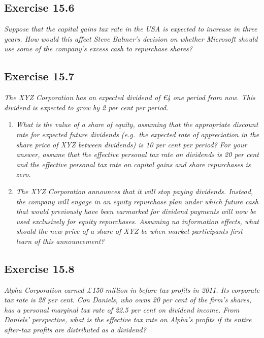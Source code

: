 \documentclass[]{book}
\newcommand{\euro}{€}
\theoremstyle{definition}
\theoremstyle{definition}
\theoremstyle{remark}
\begin{document}
\subsection{Exercise 15.6}\label{exercise-15.6}

\emph{Suppose that the capital gains tax rate in the USA is expected to
increase in three years. How would this affect Steve Balmer's decision
on whether Microsoft should use some of the company's excess cash to
repurchase shares?} \citep[p.518]{book}

\subsection{Exercise 15.7}\label{exercise-15.7}

\emph{The XYZ Corporation has an expected dividend of \euro{}4 one
period from now. This dividend is expected to grow by 2 per cent per
period.} \citep[p.518]{book}

\begin{enumerate}
\def\labelenumi{\alph{enumi}.}
\item
  \emph{What is the value of a share of equity, assuming that the
  appropriate discount rate for expected future dividends (e.g.~the
  expected rate of appreciation in the share price of XYZ between
  dividends) is 10 per cent per period? For your answer, assume that the
  effective personal tax rate on dividends is 20 per cent and the
  effective personal tax rate on capital gains and share repurchases is
  zero.} \citep[p.518]{book}
\item
  \emph{The XYZ Corporation announces that it will stop paying
  dividends. Instead, the company will engage in an equity repurchase
  plan under which future cash that would previously have been earmarked
  for dividend payments will now be used exclusively for equity
  repurchases. Assuming no information effects, what should the new
  price of a share of XYZ be when market participants first learn of
  this announcement?} \citep[p.518]{book}
\end{enumerate}

\subsection{Exercise 15.8}\label{exercise-15.8}

\emph{Alpha Corporation earned £150 million in before-tax profits in
2011. Its corporate tax rate is 28 per cent. Con Daniels, who owns 20
per cent of the firm's shares, has a personal marginal tax rate of 22.5
per cent on dividend income. From Daniels' perspective, what is the
effective tax rate on Alpha's profits if its entire after-tax profits
are distributed as a dividend?} \citep[p.519]{book}
\end{document}
